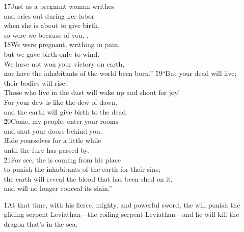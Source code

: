 \begin{poetry}
\poeml \v{17}Just as a pregnant woman writhes \\
\poemll    and cries out during her labor \\
\poeml when she is about to give birth, \\
\poemll    so were we because of you, . \\
\poeml \v{18}We were pregnant, writhing in pain, \\
\poemll    but we gave birth only to wind. \\
\poeml We have not won your victory on earth, \\
\poeml nor have the inhabitants of the world been born.''
\poeml \v{19}``But your dead will live; their bodies will rise. \\
\poeml Those who live in the dust will wake up and shout for joy! \\
\poeml For your dew is like the dew of dawn, \\
\poeml and the earth will give birth to the dead. \\
\poeml \v{20}Come, my people, enter your rooms \\
\poemll    and shut your doors behind you. \\
\poeml Hide yourselves for a little while \\
\poemll    until the fury has passed by. \\
\poeml \v{21}For see, the  is coming from his place \\
\poemll    to punish the inhabitants of the earth for their sins; \\
\poeml the earth will reveal the blood that has been shed on it, \\
\poemll    and will no longer conceal its slain.''
\end{poetry}

\v{1}At that time, with his fierce, mighty, and powerful sword, the  will punish the gliding serpent Leviathan---the coiling serpent Leviathan---and he will kill the dragon that's in the sea.

